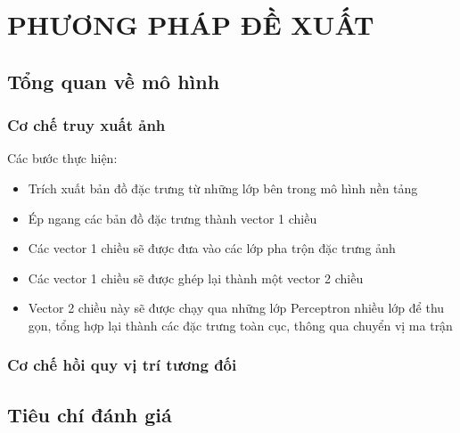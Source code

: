 \chapter{PHƯƠNG PHÁP ĐỀ XUẤT}

\section{Tổng quan về mô hình}
\subsection{Cơ chế truy xuất ảnh}
Các bước thực hiện:
\begin{itemize}
    \item Trích xuất bản đồ đặc trưng từ những lớp bên trong mô hình nền tảng
    \item Ép ngang các bản đồ đặc trưng thành vector 1 chiều
    \item Các vector 1 chiều sẽ được đưa vào các lớp pha trộn đặc trưng ảnh
    \item Các vector 1 chiều sẽ được ghép lại thành một vector 2 chiều
    \item Vector 2 chiều này sẽ được chạy qua những lớp Perceptron nhiều lớp để thu gọn, tổng hợp lại thành các đặc trưng toàn cục, thông qua chuyển vị ma trận
\end{itemize}
\subsection{Cơ chế hồi quy vị trí tương đối}

\section{Tiêu chí đánh giá}


